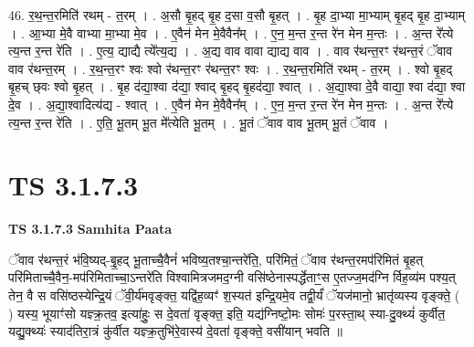 \documentclass[17pt]{extarticle}
\begin{document}
46. र॒थ॒न्त॒रमिति॑ रथम् - त॒रम् । . अ॒सौ बृ॒हद् बृ॒ह द॒सा व॒सौ बृ॒हत् । . बृ॒ह दा॒भ्या मा॒भ्याम् बृ॒हद् बृ॒ह दा॒भ्याम् । . आ॒भ्या मे॒वै वाभ्या मा॒भ्या मे॒व । . ए॒वैन॑ मेन मे॒वैवैन᳚म् । . ए॒न॒ म॒न्त र॒न्त रे॑न मेन म॒न्तः । . अ॒न्त रे᳚त्ये त्य॒न्त र॒न्त रे॑ति । . ए॒त्य॒ द्याद्यै त्ये᳚त्य॒द्य । . अ॒द्य वाव वावा द्याद्य वाव । . वाव र॑थन्त॒रꣳ र॑थन्त॒रं ॅवाव वाव र॑थन्त॒रम् । . र॒थ॒न्त॒रꣳ श्वः श्वो र॑थन्त॒रꣳ र॑थन्त॒रꣳ श्वः । . र॒थ॒न्त॒रमिति॑ रथम् - त॒रम् । . श्वो बृ॒हद् बृ॒हच् छ्‌वः श्वो बृ॒हत् । . बृ॒ह द॑द्या॒श्वा द॑द्या॒ श्वाद् बृ॒हद् बृ॒हद॑द्या॒ श्वात् । . अ॒द्या॒श्वा दे॒वै वाद्या॒ श्वा द॑द्या॒ श्वा दे॒व । . अ॒द्या॒श्वादित्य॑द्य - श्वात् । . ए॒वैन॑ मेन मे॒वैवैन᳚म् । . ए॒न॒ म॒न्त र॒न्त रे॑न मेन म॒न्तः । . अ॒न्त रे᳚त्ये त्य॒न्त र॒न्त रे॑ति । . ए॒ति॒ भू॒तम् भू॒त मे᳚त्येति भू॒तम् । . भू॒तं ॅवाव वाव भू॒तम् भू॒तं ॅवाव । \newline
\pagebreak
{}

\section{ TS 3.1.7.3 }

\textbf{TS 3.1.7.3 } \newline
\textbf{Samhita Paata} \newline

ॅवाव र॑थन्त॒रं भ॑वि॒ष्यद्-बृ॒॒हद् भू॒ताच्चै॒वैनं॑ भविष्य॒तश्चा॒न्तरे॑ति॒, परि॑मितं॒ ॅवाव र॑थन्त॒रमप॑रिमितं बृ॒हत् परि॑मिताच्चै॒वैन॒-मप॑रिमिताच्चा॒ऽन्तरे॑ति विश्वामित्रजमद॒ग्नी वसि॑ष्ठेनास्पर्द्धेताꣳ॒॒स ए॒तज्ज॒मद॑ग्नि र्विह॒व्य॑म पश्य॒त् तेन॒ वै स वसि॑ष्ठस्येन्द्रि॒यं ॅवी॒र्य॑मवृङ्क्त॒ यद्वि॑ह॒व्यꣳ॑ श॒स्यत॑ इन्द्रि॒यमे॒व तद्वी॒र्यं॑ ॅयज॑मानो॒ भ्रातृ॑व्यस्य वृङ्क्ते॒ ( ) यस्य॒ भूयाꣳ॑सो यज्ञ्क्र॒तव॒ इत्या॑हुः॒ स दे॒वता॑ वृङ्क्त॒ इति॒ यद्य॑ग्निष्टो॒मः सोमः॑ प॒रस्ता॒थ् स्या-दु॒क्थ्यं॑ कुर्वीत॒ यद्यु॒क्थ्यः॑ स्याद॑तिरा॒त्रं कु॑र्वीत यज्ञ्क्र॒तुभि॑रे॒वास्य॑ दे॒वता॑ वृङ्क्ते॒ वसी॑यान् भवति ॥ \newline
\end{document}
